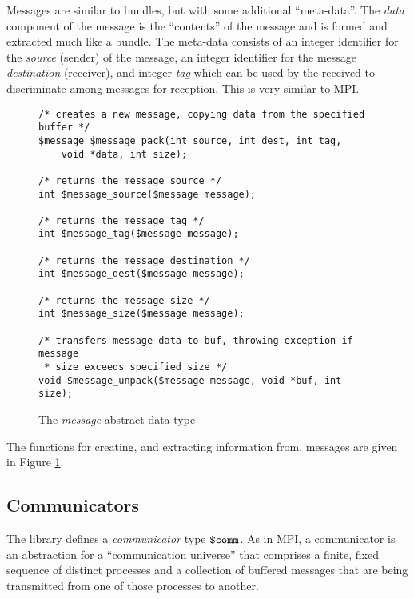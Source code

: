 Messages are similar to bundles, but with some additional
``meta-data''.  The \emph{data} component of the message is the
``contents'' of the message and is formed and extracted much like a
bundle.  The meta-data consists of an integer identifier for the
\emph{source} (sender) of the message, an integer identifier for the
message \emph{destination} (receiver), and integer \emph{tag} which
can be used by the received to discriminate among messages for
reception.  This is very similar to MPI.

\begin{figure}
\begin{verbatim}
/* creates a new message, copying data from the specified buffer */ 
$message $message_pack(int source, int dest, int tag,
    void *data, int size);

/* returns the message source */ 
int $message_source($message message);

/* returns the message tag */
int $message_tag($message message);

/* returns the message destination */ 
int $message_dest($message message);

/* returns the message size */ 
int $message_size($message message);

/* transfers message data to buf, throwing exception if message
 * size exceeds specified size */ 
void $message_unpack($message message, void *buf, int size);
\end{verbatim}
  \caption{The \emph{message} abstract data type}
  \label{fig:message}
\end{figure}

The functions for creating, and extracting information from, messages
are given in Figure \ref{fig:message}.

\subsection{Communicators}

The library defines a \emph{communicator} type $\mbox{\texttt{\${}comm}}$.  As in MPI, a
communicator is an abstraction for a ``communication universe'' that
comprises a finite, fixed sequence of distinct processes and a
collection of buffered messages that are being transmitted from one of
those processes to another.

